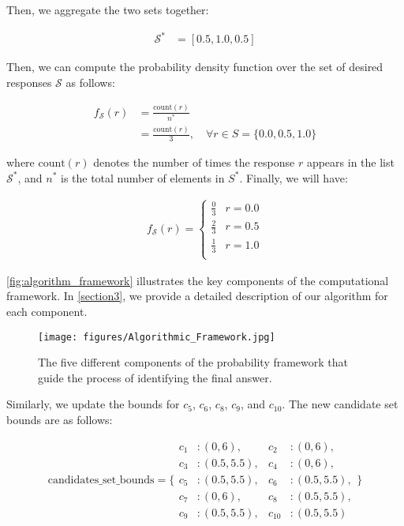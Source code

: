 Then, we aggregate the two sets together:

\begin{align*}
    \mathcal{S}^* & = [0.5, 1.0, 0.5]
\end{align*}


Then, we can compute the probability density function over the set of desired responses \( \mathcal{S} \) as follows:

\begin{align*}
    f_{\mathcal{S}}(r) & = \frac{\text{count}(r)}{n^*} \\
                       & = \frac{\text{count}(r)}{3}, \quad \forall r \in S = \{0.0, 0.5, 1.0\}
\end{align*}


where \( \text{count}(r) \) denotes the number of times the response \( r \) appears in the list \( \mathcal{S}^* \), and $n^*$ is the total number of elements in $S^*$. Finally, we will have:

\begin{align*}
    f_{\mathcal{S}}(r) =
    \begin{cases}
        \frac{0}{3} & r = 0.0 \\
        \frac{2}{3} & r = 0.5 \\
        \frac{1}{3} & r = 1.0 \\
    \end{cases}
\end{align*}



\autoref{fig:algorithm_framework} illustrates the key components of the computational framework. In \autoref{section3}, we provide a detailed description of our algorithm for each component.
\begin{figure}[ht]
    \centering
    \texttt{[image: figures/Algorithmic\_Framework.jpg]}
    \caption{The five different components of the probability framework that guide the process of identifying the final answer.}
    \label{fig:algorithm_framework}
\end{figure}


Similarly, we update the bounds for \( c_{5} \), \( c_{6} \), \( c_{8} \), \( c_{9} \), and \( c_{10} \). The new candidate set bounds are as follows:

\[
\text{candidates\_set\_bounds} = \{ 
\begin{aligned}
c_1 &: (0, 6), & c_2 &: (0, 6), \\
c_3 &: (0.5, 5.5), & c_4 &: (0, 6), \\
c_5 &: (0.5, 5.5), & c_6 &: (0.5, 5.5), \\
c_7 &: (0, 6), & c_8 &: (0.5, 5.5), \\
c_9 &: (0.5, 5.5), & c_{10} &: (0.5, 5.5) 
\end{aligned}
\}
\]


